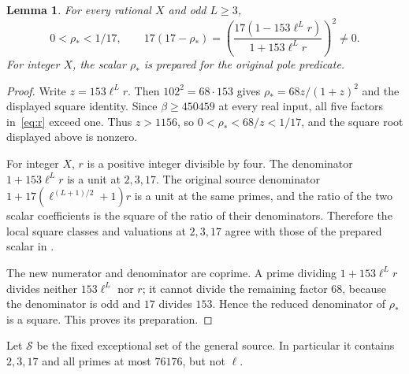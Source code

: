 \documentclass[11pt,a4paper]{article}
\newtheorem{lemma}[theorem]{Lemma}
\begin{document}
\begin{lemma}\label{lem:square}
For every rational $X$ and odd $L\ge3$,
\[
 0<\rho_*<1/17,\qquad
 17(17-\rho_*)=
 \left(\frac{17(1-153\ell^Lr)}{1+153\ell^Lr}\right)^2\ne0.
\]
For integer $X$, the scalar $\rho_*$ is prepared for the original pole
predicate.
\end{lemma}
\begin{proof}
Write $z=153\ell^Lr$. Then $102^2=68\cdot153$ gives
$\rho_*=68z/(1+z)^2$ and the displayed square identity. Since
$\beta\ge450459$ at every real input, all five factors in~\eqref{eq:r}
exceed one. Thus $z>1156$, so $0<\rho_*<68/z<1/17$, and the square
root displayed above is nonzero.

For integer $X$, $r$ is a positive integer divisible by four.
The denominator $1+153\ell^Lr$ is a unit at $2,3,17$.
The original source denominator
$1+17(\ell^{(L+1)/2}+1)r$ is a unit at the same primes, and the ratio
of the two scalar coefficients is the square of the ratio of their
denominators. Therefore the local square classes and valuations at
$2,3,17$ agree with those of the prepared scalar in \cite{General}.

The new numerator and denominator are coprime. A prime dividing
$1+153\ell^Lr$ divides neither $153\ell^L$ nor $r$; it cannot divide
the remaining factor $68$, because the denominator is odd and $17$
divides $153$. Hence the reduced denominator of $\rho_*$ is a square.
This proves its preparation.
\end{proof}

Let $\mathcal S$ be the fixed exceptional set of the general source.
In particular it contains $2,3,17$ and all primes at most $76176$,
but not $\ell$.
\end{document}
